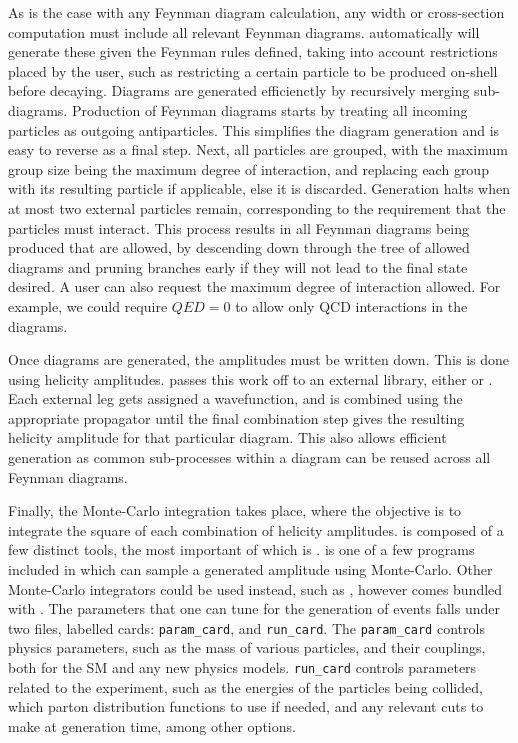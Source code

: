 As is the case with any Feynman diagram calculation, any width or cross-section computation must include all relevant Feynman diagrams.
\madgraph automatically will generate these given the Feynman rules defined, taking into account restrictions placed by the user, such as restricting a certain particle to be produced on-shell before decaying.
Diagrams are generated efficienctly by recursively merging sub-diagrams.
Production of Feynman diagrams starts by treating all incoming particles as outgoing antiparticles.
This simplifies the diagram generation and is easy to reverse as a final step.
Next, all particles are grouped, with the maximum group size being the maximum degree of interaction, and replacing each group with its resulting particle if applicable, else it is discarded.
Generation halts when at most two external particles remain, corresponding to the requirement that the particles must interact.
This process results in all Feynman diagrams being produced that are allowed, by descending down through the tree of allowed diagrams and pruning branches early if they will not lead to the final state desired.
A user can also request the maximum degree of interaction allowed.
For example, we could require $QED=0$ to allow only QCD interactions in the diagrams.

Once diagrams are generated, the amplitudes must be written down.
This is done using helicity amplitudes.
\madgraph passes this work off to an external library, either \helas \cite{Murayama:1992gi} or \aloha \cite{deAquino:2011ub}.
Each external leg gets assigned a wavefunction, and is combined using the appropriate propagator until the final combination step gives the resulting helicity amplitude for that particular diagram.
This also allows efficient generation as common sub-processes within a diagram can be reused across all Feynman diagrams.

Finally, the Monte-Carlo integration takes place, where the objective is to integrate the square of each combination of helicity amplitudes.
\madgraph is composed of a few distinct tools, the most important of which is \madevent.
\madevent is one of a few programs included in \madgraph which can sample a generated amplitude using Monte-Carlo.
Other Monte-Carlo integrators could be used instead, such as \pythia, however \madevent comes bundled with \madgraph.
The parameters that one can tune for the generation of events falls under two files, labelled cards: \texttt{param\_card}, and \texttt{run\_card}.
The \texttt{param\_card} controls physics parameters, such as the mass of various particles, and their couplings, both for the SM and any new physics models.
\texttt{run\_card} controls parameters related to the experiment, such as the energies of the particles being collided, which parton distribution functions to use if needed, and any relevant cuts to make at generation time, among other options.

